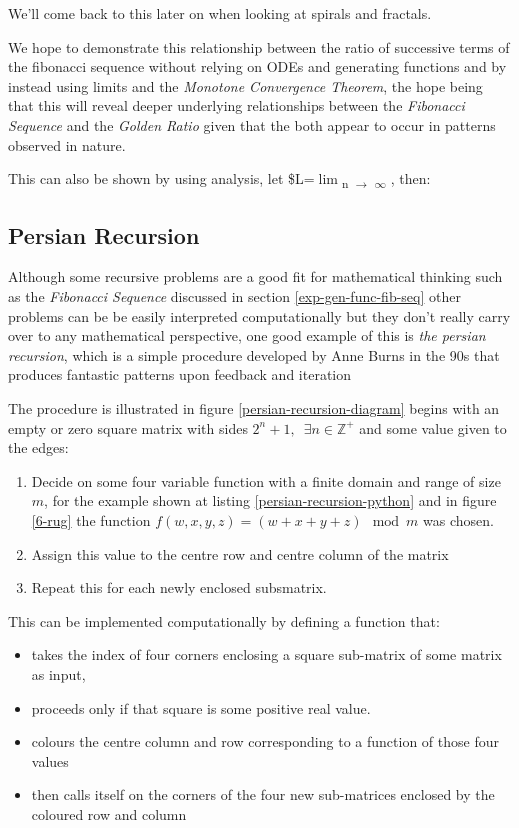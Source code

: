 \documentclass[11pt]{article}
\begin{document}
We'll come back to this later on when looking at spirals and fractals.

We hope to demonstrate this relationship between the ratio of successive terms
of the fibonacci sequence without relying on ODEs and generating functions and
by instead using limits and the \emph{Monotone Convergence Theorem}, the hope being that this will reveal deeper underlying relationships between the \emph{Fibonacci Sequence} and the \emph{Golden Ratio} given that the both appear to occur in patterns observed in nature.

This can also be shown by using analysis, let \$L=\(\lim\)\textsubscript{n \(\rightarrow\) \(\infty\)}
, then:

\subsection{Persian Recursion}
\label{sec:org81c0e2a}
Although some recursive problems are a good fit for mathematical thinking such as the \emph{Fibonacci Sequence} discussed in section \ref{exp-gen-func-fib-seq} other problems
can be be easily interpreted computationally but they don't really carry over to any mathematical perspective, one good example of this is \emph{the persian recursion}, which is a simple procedure developed by Anne Burns in the 90s \cite{burnsPersianRecursion1997} that produces fantastic patterns upon feedback and iteration

The procedure is illustrated in figure \ref{persian-recursion-diagram} begins with an empty or zero square matrix with sides \(2^{n}+1,
\enspace \exists n\in \mathbb{Z}^{+}\) and some value given to the edges:

\begin{enumerate}
\item Decide on some four variable function with a finite domain and range of size \(m\), for the example shown at listing \ref{persian-recursion-python} and in figure \ref{6-rug} the function \(f(w,x,y,z)=(w+x+y+z) \mod m\) was chosen.
\item Assign this value to the centre row and centre column of the matrix
\item Repeat this for each newly enclosed subsmatrix.
\end{enumerate}

This can be implemented computationally by defining a function that:

\begin{itemize}
\item takes the index of four corners enclosing a square sub-matrix of some matrix as input,
\item proceeds only if that square is some positive real value.
\item colours the centre column and row corresponding to a function of those four values
\item then calls itself on the corners of the four new sub-matrices enclosed by the
coloured row and column
\end{itemize}
\end{document}
